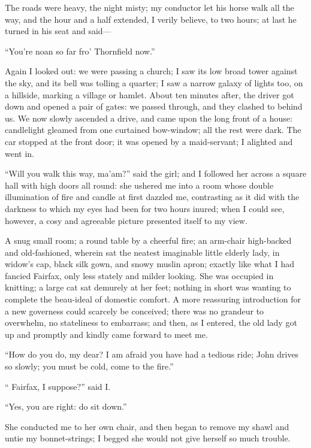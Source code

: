 The roads were heavy, the night misty; my conductor let his horse walk
all the way, and the hour and a half extended, I verily believe, to two
hours; at last he turned in his seat and said---

\enquote{You're noan so far fro' Thornfield now.}

Again I looked out: we were passing a church; I saw its low broad tower
against the sky, and its bell was tolling a quarter; I saw a narrow
galaxy of lights too, on a hillside, marking a village or hamlet. About
ten minutes after, the driver got down and opened a pair of gates: we
passed through, and they clashed to behind us. We now slowly ascended a
drive, and came upon the long front of a house: candlelight gleamed from
one curtained bow-window; all the rest were dark. The car stopped at
the front door; it was opened by a maid-servant; I alighted and went in.

\enquote{Will you walk this way, ma'am?} said the girl; and I followed
her across a square hall with high doors all round: she ushered me into
a room whose double illumination of fire and candle at first dazzled me,
contrasting as it did with the darkness to which my eyes had been for
two hours inured; when I could see, however, a cosy and agreeable
picture presented itself to my view.

A snug small room; a round table by a cheerful fire; an arm-chair
high-backed and old-fashioned, wherein sat the neatest imaginable little
elderly lady, in widow's cap, black silk gown, and snowy muslin apron;
exactly like what I had fancied \Mrs{} Fairfax, only less stately and
milder looking. She was occupied in knitting; a large cat sat demurely
at her feet; nothing in short was wanting to complete the beau-ideal of
domestic comfort. A more reassuring introduction for a new governess
could scarcely be conceived; there was no grandeur to overwhelm, no
stateliness to embarrass; and then, as I entered, the old lady got up
and promptly and kindly came forward to meet me.

\enquote{How do you do, my dear? I am afraid you have had a tedious
	ride; John drives so slowly; you must be cold, come to the fire.}

\enquote{\Mrs{} Fairfax, I suppose?} said I\@.

\enquote{Yes, you are right: do sit down.}

She conducted me to her own chair, and then began to remove my shawl and
untie my bonnet-strings; I begged she would not give herself so much
trouble.

